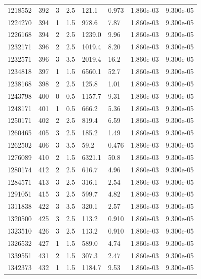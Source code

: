 \documentclass[preview]{standalone}
\begin{document}
{{{{\begin{tabular}{L{1.2cm}C{1.2cm} C{0.3cm}C{0.5cm} C{1.4cm}C{1.4cm} C{1.4cm}C{1.4cm}}
  1218552  &   392  & 3     & 2.5 &  121.1  & 0.973  & 1.860e-03 &  9.300e-05   \\ 
  1224270  &   394  & 1     & 1.5 &  978.6  & 7.87  & 1.860e-03 &  9.300e-05   \\ 
  1226168  &   394  & 2     & 2.5 &  1239.0  & 9.96  & 1.860e-03 &  9.300e-05   \\ 
  1232171  &   396  & 2     & 2.5 &  1019.4  & 8.20  & 1.860e-03 &  9.300e-05   \\ 
  1232571  &   396  & 3     & 3.5 &  2019.4  & 16.2  & 1.860e-03 &  9.300e-05   \\ 
  1234818  &   397  & 1     & 1.5 &  6560.1  & 52.7  & 1.860e-03 &  9.300e-05   \\ 
  1238168  &   398  & 2     & 2.5 &  125.8  & 1.01  & 1.860e-03 &  9.300e-05   \\ 
  1243798  &   400  & 0     & 0.5 &  1157.7  & 9.31  & 1.860e-03 &  9.300e-05   \\ 
  1248171  &   401  & 1     & 0.5 &  666.2  & 5.36  & 1.860e-03 &  9.300e-05   \\ 
  1250171  &   402  & 2     & 2.5 &  819.4  & 6.59  & 1.860e-03 &  9.300e-05   \\ 
  1260465  &   405  & 3     & 2.5 &  185.2  & 1.49  & 1.860e-03 &  9.300e-05   \\ 
  1262502  &   406  & 3     & 3.5 &  59.2  & 0.476  & 1.860e-03 &  9.300e-05   \\ 
  1276089  &   410  & 2     & 1.5 &  6321.1  & 50.8  & 1.860e-03 &  9.300e-05   \\ 
  1280174  &   412  & 2     & 2.5 &  616.7  & 4.96  & 1.860e-03 &  9.300e-05   \\ 
  1284571  &   413  & 3     & 2.5 &  316.1  & 2.54  & 1.860e-03 &  9.300e-05   \\ 
  1291051  &   415  & 3     & 2.5 &  599.7  & 4.82  & 1.860e-03 &  9.300e-05   \\ 
  1311838  &   422  & 3     & 3.5 &  320.1  & 2.57  & 1.860e-03 &  9.300e-05   \\ 
  1320500  &   425  & 3     & 2.5 &  113.2  & 0.910  & 1.860e-03 &  9.300e-05   \\ 
  1323510  &   426  & 3     & 2.5 &  113.2  & 0.910  & 1.860e-03 &  9.300e-05   \\ 
  1326532  &   427  & 1     & 1.5 &  589.0  & 4.74  & 1.860e-03 &  9.300e-05   \\ 
  1339551  &   431  & 2     & 1.5 &  307.3  & 2.47  & 1.860e-03 &  9.300e-05   \\ 
  1342373  &   432  & 1     & 1.5 &  1184.7  & 9.53  & 1.860e-03 &  9.300e-05   \\ 

\end{tabular}}}}}
\end{document}
